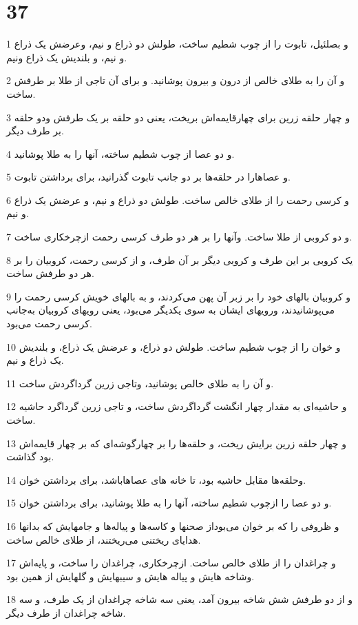 \chapter{37}

\par 1 و بصلئیل، تابوت را از چوب شطیم ساخت، طولش دو ذراع و نیم، وعرضش یک ذراع و نیم، و بلندیش یک ذراع ونیم.
\par 2 و آن را به طلای خالص از درون و بیرون پوشانید. و برای آن تاجی از طلا بر طرفش ساخت.
\par 3 و چهار حلقه زرین برای چهارقایمه‌اش بریخت، یعنی دو حلقه بر یک طرفش ودو حلقه بر طرف دیگر.
\par 4 و دو عصا از چوب شطیم ساخته، آنها را به طلا پوشانید.
\par 5 و عصاهارا در حلقه‌ها بر دو جانب تابوت گذرانید، برای برداشتن تابوت.
\par 6 و کرسی رحمت را از طلای خالص ساخت. طولش دو ذراع و نیم، و عرضش یک ذراع و نیم.
\par 7 و دو کروبی از طلا ساخت. وآنها را بر هر دو طرف کرسی رحمت ازچرخکاری ساخت.
\par 8 یک کروبی بر این طرف و کروبی دیگر بر آن طرف، و از کرسی رحمت، کروبیان را بر هر دو طرفش ساخت.
\par 9 و کروبیان بالهای خود را بر زبر آن پهن می‌کردند، و به بالهای خویش کرسی رحمت را می‌پوشانیدند، ورویهای ایشان به سوی یکدیگر می‌بود، یعنی رویهای کروبیان به‌جانب کرسی رحمت می‌بود.
\par 10 و خوان را از چوب شطیم ساخت. طولش دو ذراع، و عرضش یک ذراع، و بلندیش یک ذراع و نیم.
\par 11 و آن را به طلای خالص پوشانید، وتاجی زرین گرداگردش ساخت.
\par 12 و حاشیه‌ای به مقدار چهار انگشت گرداگردش ساخت، و تاجی زرین گرداگرد حاشیه ساخت.
\par 13 و چهار حلقه زرین برایش ریخت، و حلقه‌ها را بر چهارگوشه‌ای که بر چهار قایمه‌اش بود گذاشت.
\par 14 وحلقه‌ها مقابل حاشیه بود، تا خانه های عصاهاباشد، برای برداشتن خوان.
\par 15 و دو عصا را ازچوب شطیم ساخته، آنها را به طلا پوشانید، برای برداشتن خوان.
\par 16 و ظروفی را که بر خوان می‌بوداز صحنها و کاسه‌ها و پیاله‌ها و جامهایش که بدانها هدایای ریختنی می‌ریختند، از طلای خالص ساخت.
\par 17 و چراغدان را از طلای خالص ساخت. ازچرخکاری، چراغدان را ساخت، و پایه‌اش وشاخه هایش و پیاله هایش و سیبهایش و گلهایش از همین بود.
\par 18 و از دو طرفش شش شاخه بیرون آمد، یعنی سه شاخه چراغدان از یک طرف، و سه شاخه چراغدان از طرف دیگر.
